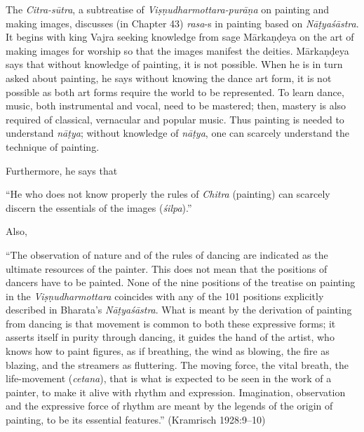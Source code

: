 The \textsl{Citra-sūtra}, a subtreatise of \textsl{Viṣṇudharmottara-purāṇa} on painting and making images, discusses (in Chapter 43) \textsl{rasa}-s in painting based on \textsl{Nāṭyaśāstra}. It begins with king Vajra seeking knowledge from sage Mārkaṇḍeya on the art of making images for worship so that the images manifest the deities. Mārkaṇḍeya says that without knowledge of painting, it is not possible. When he is in turn asked about painting, he says without knowing the dance art form, it is not possible as both art forms require the world to be represented. To learn dance, music, both instrumental and vocal, need to be mastered; then, mastery is also required of classical, vernacular and popular music. Thus painting is needed to understand \textsl{nāṭya}; without knowledge of \textsl{nāṭya}, one can scarcely understand the technique of painting. 

Furthermore, he says that

\begin{myquote}
“He who does not know properly the rules of \textsl{Chitra} (painting) can scarcely discern the essentials of the images (\textsl{śilpa}).” 

Also, 

“The observation of nature and of the rules of dancing are indicated as the ultimate resources of the painter. This does not mean that the positions of dancers have to be painted. None of the nine positions of the treatise on painting in the \textsl{Viṣṇudharmottara} coincides with any of the 101 positions explicitly described in Bharata's \textsl{Nāṭyaśāstra}. What is meant by the derivation of painting from dancing is that movement is common to both these expressive forms; it asserts itself in purity through dancing, it guides the hand of the artist, who knows how to paint figures, as if breathing, the wind as blowing, the fire as blazing, and the streamers as fluttering. The moving force, the vital breath, the life-movement (\textsl{cetana}), that is what is expected to be seen in the work of a painter, to make it alive with rhythm and expression. Imagination, observation and the expressive force of rhythm are meant by the legends of the origin of painting, to be its essential features.” \hfill (Kramrisch 1928:9--10)
\end{myquote}


